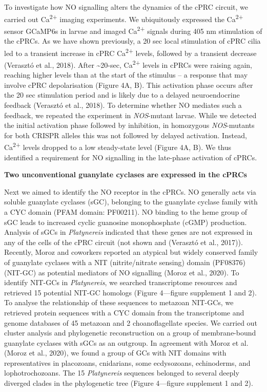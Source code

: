 \documentclass[
  10pt,
  onecolumn]{article}
\begin{document}
To investigate how NO signalling alters the dynamics of the cPRC
circuit, we carried out Ca\textsuperscript{2+} imaging experiments. We
ubiquitously expressed the Ca\textsuperscript{2+} sensor GCaMP6s in
larvae and imaged Ca\textsuperscript{2+} signals during 405 nm
stimulation of the cPRCs. As we have shown previously, a 20 sec local
stimulation of cPRC cilia led to a transient increase in cPRC
Ca\textsuperscript{2+} levels, followed by a transient decrease
(Verasztó et al., 2018). After \textasciitilde20-sec,
Ca\textsuperscript{2+} levels in cPRCs were raising again, reaching
higher levels than at the start of the stimulus -- a response that may
involve cPRC depolarisation (Figure 4A, B). This activation phase occurs
after the 20 sec stimulation period and is likely due to a delayed
neuroendocrine feedback (Verasztó et al., 2018). To determine whether NO
mediates such a feedback, we repeated the experiment in
\emph{NOS}-mutant larvae. While we detected the initial activation phase
followed by inhibition, in homozygous \emph{NOS}-mutants for both CRISPR
alleles this was not followed by delayed activation. Instead,
Ca\textsuperscript{2+} levels dropped to a low steady-state level
(Figure 4A, B). We thus identified a requirement for NO signalling in
the late-phase activation of cPRCs.

\textbf{Two unconventional guanylate cyclases are expressed in the
cPRCs}

Next we aimed to identify the NO receptor in the cPRCs. NO generally
acts via soluble guanylate cyclases (sGC), belonging to the guanylate
cyclase family with a CYC domain (PFAM domain: PF00211). NO binding to
the heme group of sGC leads to increased cyclic guanosine monophosphate
(cGMP) production. Analysis of sGCs in \emph{Platynereis} indicated that
these genes are not expressed in any of the cells of the cPRC circuit
(not shown and (Verasztó et al., 2017)). Recently, Moroz and coworkers
reported an atypical but widely conserved family of guanylate cyclases
with a NIT (nitrite/nitrate sensing) domain (PF08376) (NIT-GC) as
potential mediators of NO signalling (Moroz et al., 2020). To identify
NIT-GCs in \emph{Platynereis}, we searched transcriptome resources and
retrieved 15 potential NIT-GC homologs (Figure 4---figure supplement 1
and 2). To analyse the relationship of these sequences to metazoan
NIT-GCs, we retrieved protein sequences with a CYC domain from the
transcriptome and genome databases of 45 metazoan and 2 choanoflagellate
species. We carried out cluster analysis and phylogenetic reconstruction
on a group of membrane-bound guanylate cyclases with sGCs as an
outgroup. In agreement with Moroz et al. (Moroz et al., 2020), we found
a group of GCs with NIT domains with representatives in placozoans,
cnidarians, some ecdysozoans, echinoderms, and lophotrochozoans. The 15
\emph{Platynereis} sequences belonged to several deeply diverged clades
in the phylogenetic tree (Figure 4---figure supplement 1 and 2).
\end{document}
